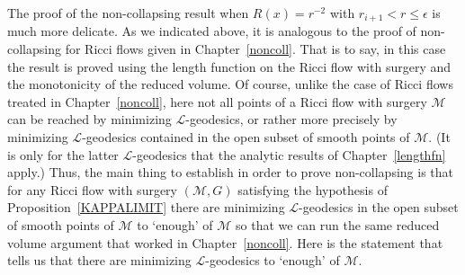 The proof of the non-collapsing result when $R(x)=r^{-2}$ with
$r_{i+1}<r\le \epsilon$ is much more delicate. As we indicated
above, it is analogous to the proof of non-collapsing for Ricci
flows given in Chapter~\ref{noncoll}. That is to say, in this case
the result is proved using the length function on the Ricci flow
with surgery and the monotonicity of the reduced volume. Of course,
unlike the case of Ricci flows treated in Chapter~\ref{noncoll},
here not all points of a Ricci flow with surgery ${\mathcal M}$ can
be reached by minimizing ${\mathcal L}$-geodesics, or rather more
precisely by minimizing ${\mathcal L}$-geodesics contained in the
open subset of smooth points of ${\mathcal M}$. (It is only for the
latter ${\mathcal L}$-geodesics that the analytic results of
Chapter~\ref{lengthfn} apply.) Thus, the main thing to establish in
order to prove non-collapsing is that for any Ricci flow with
surgery $({\mathcal M},G)$ satisfying the hypothesis of
Proposition~\ref{KAPPALIMIT} there are minimizing ${\mathcal
L}$-geodesics in the open subset of smooth points of ${\mathcal M}$
to `enough' of ${\mathcal M}$ so that we can run the same reduced
volume argument that worked in Chapter~\ref{noncoll}. Here is the
statement that tells us that there are minimizing ${\mathcal
L}$-geodesics to `enough' of ${\mathcal M}$.






